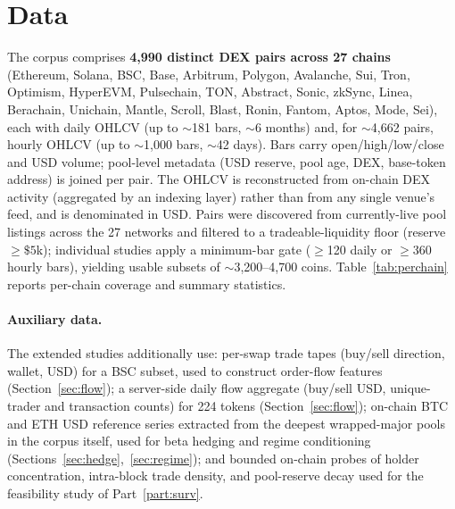 \documentclass[12pt]{article}
\begin{document}
\section{Data}\label{sec:data}
The corpus comprises \textbf{4{,}990 distinct DEX pairs across 27 chains} (Ethereum, Solana, BSC, Base, Arbitrum, Polygon, Avalanche, Sui, Tron, Optimism, HyperEVM, Pulsechain, TON, Abstract, Sonic, zkSync, Linea, Berachain, Unichain, Mantle, Scroll, Blast, Ronin, Fantom, Aptos, Mode, Sei), each with daily OHLCV (up to $\sim$181 bars, $\sim$6 months) and, for $\sim$4{,}662 pairs, hourly OHLCV (up to $\sim$1{,}000 bars, $\sim$42 days). Bars carry open/high/low/close and USD volume; pool-level metadata (USD reserve, pool age, DEX, base-token address) is joined per pair. The OHLCV is reconstructed from on-chain DEX activity (aggregated by an indexing layer) rather than from any single venue's feed, and is denominated in USD. Pairs were discovered from currently-live pool listings across the 27 networks and filtered to a tradeable-liquidity floor (reserve $\geq\$5$k); individual studies apply a minimum-bar gate ($\geq$120 daily or $\geq$360 hourly bars), yielding usable subsets of $\sim$3{,}200--4{,}700 coins. Table~\ref{tab:perchain} reports per-chain coverage and summary statistics.

\paragraph{Auxiliary data.} The extended studies additionally use: per-swap trade tapes (buy/sell direction, wallet, USD) for a BSC subset, used to construct order-flow features (Section~\ref{sec:flow}); a server-side daily flow aggregate (buy/sell USD, unique-trader and transaction counts) for 224 tokens (Section~\ref{sec:flow}); on-chain BTC and ETH USD reference series extracted from the deepest wrapped-major pools in the corpus itself, used for beta hedging and regime conditioning (Sections~\ref{sec:hedge},~\ref{sec:regime}); and bounded on-chain probes of holder concentration, intra-block trade density, and pool-reserve decay used for the feasibility study of Part~\ref{part:surv}.
\end{document}
